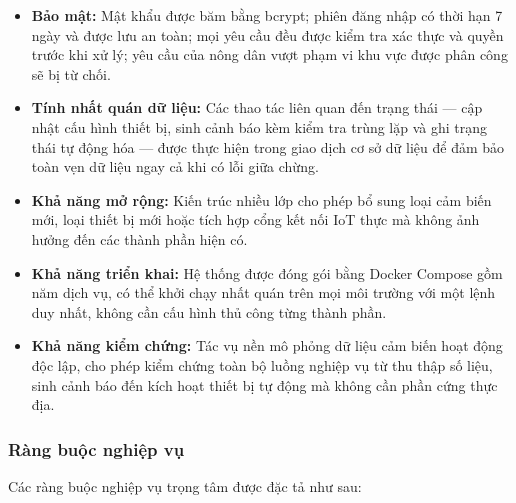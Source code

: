 \documentclass[13pt,a4paper]{extarticle}
\numberwithin{figure}{section}
\numberwithin{table}{section}
\begin{document}
	\begin{itemize}[leftmargin=1.5cm,label=-]
		\item \textbf{Bảo mật:} Mật khẩu được băm bằng bcrypt; phiên đăng nhập có thời hạn 7 ngày và được lưu an toàn; mọi yêu cầu đều được kiểm tra xác thực và quyền trước khi xử lý; yêu cầu của nông dân vượt phạm vi khu vực được phân công sẽ bị từ chối.
		\item \textbf{Tính nhất quán dữ liệu:} Các thao tác liên quan đến trạng thái --- cập nhật cấu hình thiết bị, sinh cảnh báo kèm kiểm tra trùng lặp và ghi trạng thái tự động hóa --- được thực hiện trong giao dịch cơ sở dữ liệu để đảm bảo toàn vẹn dữ liệu ngay cả khi có lỗi giữa chừng.
		\item \textbf{Khả năng mở rộng:} Kiến trúc nhiều lớp cho phép bổ sung loại cảm biến mới, loại thiết bị mới hoặc tích hợp cổng kết nối IoT thực mà không ảnh hưởng đến các thành phần hiện có.
		\item \textbf{Khả năng triển khai:} Hệ thống được đóng gói bằng Docker Compose gồm năm dịch vụ, có thể khởi chạy nhất quán trên mọi môi trường với một lệnh duy nhất, không cần cấu hình thủ công từng thành phần.
		\item \textbf{Khả năng kiểm chứng:} Tác vụ nền mô phỏng dữ liệu cảm biến hoạt động độc lập, cho phép kiểm chứng toàn bộ luồng nghiệp vụ từ thu thập số liệu, sinh cảnh báo đến kích hoạt thiết bị tự động mà không cần phần cứng thực địa.
	\end{itemize}
	
	\subsubsection{Ràng buộc nghiệp vụ}
	
	Các ràng buộc nghiệp vụ trọng tâm được đặc tả như sau:
	
\end{document}
